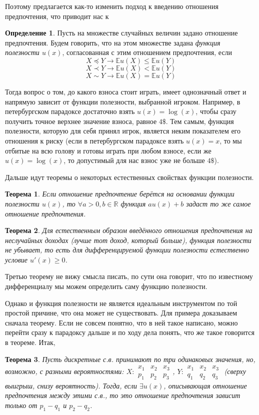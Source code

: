 \documentclass{article}
\newtheorem{theorem}{Теорема}
\theoremstyle{definition}
\newtheorem{definition}{Определение}
\begin{document}
Поэтому предлагается как-то изменить подход к введению отношения предпочтения, что приводит нас к 
\begin{definition}
Пусть на множестве случайных величин задано отношение предпочтения. Будем говорить, что на этом множестве задана \textit{функция полезности $u(x)$}, согласованная с этим отношением предпочтения, если 
$$X \preceq Y \longrightarrow \mathbb{E}u(X) \le \mathbb{E}u(Y)$$ $$X \prec Y \longrightarrow \mathbb{E}u(X) < \mathbb{E}u(Y)$$ $$X \sim Y \longrightarrow \mathbb{E}u(X) = \mathbb{E}u(Y)$$
\end{definition}
Тогда вопрос о том, до какого взноса стоит играть, имеет однозначный ответ и напрямую зависит от функции полезности, выбранной игроком. Например, в петербургском парадоксе достаточно взять $u(x) = \log(x)$, чтобы сразу получить точное верхнее значение взноса, равное $4\$$. Тем самым, функция полезности, которую для себя принял игрок, является неким показателем его отношения к риску (если в петербургском парадоксе взять $u(x) = x$, то мы отбитые на всю голову и готовы играть при любом взносе, если же $u(x) = \log(x)$, то допустимый для нас взнос уже не больше $4\$$).

Дальше идут теоремы о некоторых естественных свойствах функции полезности. 
\begin{theorem}
Если отношение предпочтение берётся на основании функции полезности $u(x)$, то $\forall a > 0, b \in \mathbb{R}$ функция $au(x) + b$ задаст то же самое отношение предпочтения.
\end{theorem}
\begin{theorem}
Для естественным образом введённого отношения предпочтения на неслучайных доходах (лучше тот доход, который больше), функция полезности не убывает, то есть для дифференцируемой функции полезности естественно условие $u'(x) \ge 0$.
\end{theorem}
Третью теорему не вижу смысла писать, по сути она говорит, что по известному дифференциалу мы можем определить саму функцию полезности.

Однако и функция полезности не является идеальным инструментом по той простой причине, что она может не существовать. Для примера доказываем сначала теорему. Если не совсем понятно, что в ней такое написано, можно перейти сразу к парадоксу дальше и по ходу дела понять, что же такое говорится в теореме. Итак,
\begin{theorem}
Пусть дискретные с.в. принимают по три одинаковых значения, но, возможно, с разными вероятностями: 
$X: \begin{smallmatrix}
x_1 & x_2 & x_3 \\
p_1 & p_2 & p_3
\end{smallmatrix}$, $Y: \begin{smallmatrix}
x_1 & x_2 & x_3 \\
q_1 & q_2 & q_3
\end{smallmatrix}$ (сверху выигрыш, снизу вероятность). Тогда, если $\exists u(x)$, описывающая отношение предпочтения между этими с.в., то это отношение предпочтения зависит только от $p_1 - q_1$ и $p_2 - q_2$.
\end{theorem}
\end{document}
